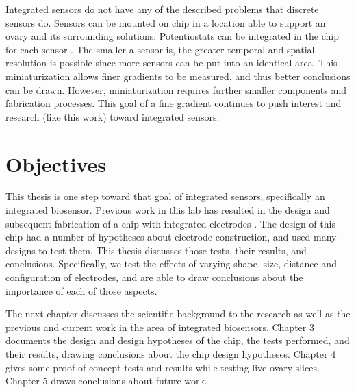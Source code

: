 Integrated sensors do not have any of the described problems that discrete sensors do. Sensors can be mounted on chip in a location able to support an ovary and its surrounding solutions. Potentiostats can be integrated in the chip for each sensor \cite{murari2005ipn, stanacevic2007vpa, zhang2005eam}. The smaller a sensor is, the greater temporal and spatial resolution is possible since more sensors can be put into an identical area. This miniaturization allows finer gradients to be measured, and thus better conclusions can be drawn. However, miniaturization requires further smaller components and fabrication processes. This goal of a fine gradient continues to push interest and research (like this work) toward integrated sensors.

\section{Objectives}

This thesis is one step toward that goal of integrated sensors, specifically an integrated biosensor. Previous work in this lab has resulted in the design and subsequent fabrication of a chip with integrated electrodes \cite{karegar2007ema}. The design of this chip had a number of hypotheses about electrode construction, and used many designs to test them. This thesis discusses those tests, their results, and conclusions. Specifically, we test the effects of varying shape, size, distance and configuration of electrodes, and are able to draw conclusions about the importance of each of those aspects.

The next chapter discusses the scientific background to the research as well as the previous and current work in the area of integrated biosensors. Chapter 3 documents the design and design hypotheses of the chip, the tests performed, and their results, drawing conclusions about the chip design hypotheses. Chapter 4 gives some proof-of-concept tests and results while testing live ovary slices. Chapter 5 draws conclusions about future work.
